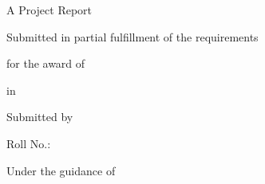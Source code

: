 \begin{titlepage}
  \centering
  \vspace*{1.5cm}

  {\Large \textbf{\college}\par}
  \vspace{0.5cm}
  {\large \department\par}
  \vspace{2cm}

  {\huge \textbf{\thesistitle}\par}
  \vspace{0.8cm}
  {\Large \thesissubtitle\par}
  \vspace{2.5cm}

  {\large A Project Report\par}
  \vspace{0.3cm}
  {\large Submitted in partial fulfillment of the requirements\par}
  {\large for the award of\par}
  \vspace{0.3cm}
  {\large \textbf{\degree}\par}
  {\large in \textbf{\branch}\par}
  \vspace{2.5cm}

  {\large Submitted by\par}
  \vspace{0.5cm}
  {\Large \textbf{\studentname}\par}
  {\large Roll No.: \rollnumber\par}
  \vspace{2cm}

  {\large Under the guidance of\par}
  \vspace{0.5cm}
  {\Large \textbf{\supervisor}\par}
  \vspace{2.5cm}

  {\large \submissiondate\par}

  \vfill
\end{titlepage}

